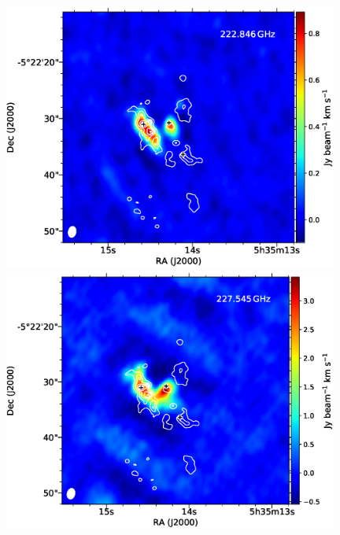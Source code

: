 \newpage

\begin{figure}[H] 
\begin{center}

\begin{minipage}{0.98\textwidth} 
\begin{center}
\begin{minipage}{0.48\textwidth}
\begin{center}
\includegraphics[width=0.98\textwidth]{OrionKL/mom0/222.846SV_mom0_3-7.eps}
\end{center}
\end{minipage}
\begin{minipage}{0.48\textwidth}
\begin{center}
\includegraphics[width=0.98\textwidth]{OrionKL/mom0/227.545SV_mom0_3-7.eps}

\end{center}
\end{minipage}
\end{center}
\end{minipage}
\end{center}
\end{figure}
